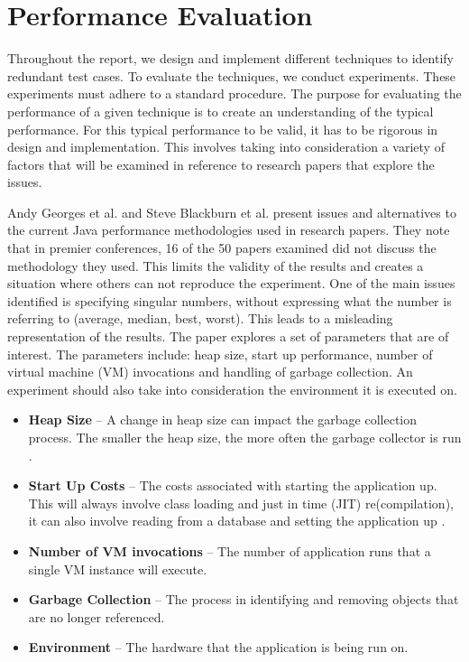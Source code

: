 \section{Performance Evaluation}
\label{performanceEvalBG}
Throughout the report, we design and implement different techniques to identify redundant test cases. To evaluate the techniques, we conduct experiments. These experiments must adhere to a standard procedure. The purpose for evaluating the performance of a given technique is to create an understanding of the typical performance. For this typical performance to be valid, it has to be rigorous in design and implementation. This involves taking into consideration a variety of factors that will be examined in reference to research papers that explore the issues.

Andy Georges et al. \cite{georges2007statistically} and Steve Blackburn et al. \cite{blackburn2008wake} present issues and alternatives to the current Java performance methodologies used in research papers. They note that in premier conferences, 16 of the 50 papers examined did not discuss the methodology they used. This limits the validity of the results and creates a situation where others can not reproduce the experiment. One of the main issues identified is specifying singular numbers, without expressing what the number is referring to (average, median, best, worst). This leads to a misleading representation of the results. The paper explores a set of parameters that are of interest. The parameters include: heap size, start up performance, number of virtual machine (VM) invocations and handling of garbage collection. An experiment should also take into consideration the environment it is executed on.
\begin{itemize}
\item \textbf{Heap Size} -- A change in heap size can impact the garbage collection process. The smaller the heap size, the more often the garbage collector is run \cite{blackburn2008wake}.
\item \textbf{Start Up Costs}  -- The costs associated with starting the application up. This will always involve class loading and just in time (JIT) re(compilation), it can also involve reading from a database and setting the application up \cite{blackburn2008wake}.
\item \textbf{Number of VM invocations} -- The number of application runs that a single VM instance will execute.
\item \textbf{Garbage Collection} -- The process in identifying and removing objects that are no longer referenced.
\item \textbf{Environment} -- The hardware that the application is being run on.
\end{itemize}

